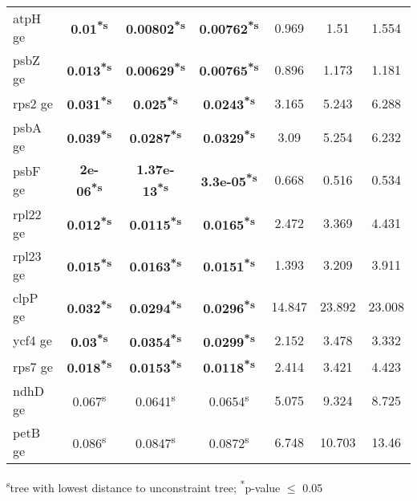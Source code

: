 \documentclass[a4paper]{article}
\begin{document}
\begin{longtable}{l|c|c|c|c|c|c}
atpH ge&\textbf{0.01\textsuperscript{*}\textsuperscript{s}}&\textbf{0.00802\textsuperscript{*}\textsuperscript{s}}&\textbf{0.00762\textsuperscript{*}\textsuperscript{s}}&0.969&1.51&1.554\\
psbZ ge&\textbf{0.013\textsuperscript{*}\textsuperscript{s}}&\textbf{0.00629\textsuperscript{*}\textsuperscript{s}}&\textbf{0.00765\textsuperscript{*}\textsuperscript{s}}&0.896&1.173&1.181\\
rps2 ge&\textbf{0.031\textsuperscript{*}\textsuperscript{s}}&\textbf{0.025\textsuperscript{*}\textsuperscript{s}}&\textbf{0.0243\textsuperscript{*}\textsuperscript{s}}&3.165&5.243&6.288\\
psbA ge&\textbf{0.039\textsuperscript{*}\textsuperscript{s}}&\textbf{0.0287\textsuperscript{*}\textsuperscript{s}}&\textbf{0.0329\textsuperscript{*}\textsuperscript{s}}&3.09&5.254&6.232\\
psbF ge&\textbf{2e-06\textsuperscript{*}\textsuperscript{s}}&\textbf{1.37e-13\textsuperscript{*}\textsuperscript{s}}&\textbf{3.3e-05\textsuperscript{*}\textsuperscript{s}}&0.668&0.516&0.534\\
rpl22 ge&\textbf{0.012\textsuperscript{*}\textsuperscript{s}}&\textbf{0.0115\textsuperscript{*}\textsuperscript{s}}&\textbf{0.0165\textsuperscript{*}\textsuperscript{s}}&2.472&3.369&4.431\\
rpl23 ge&\textbf{0.015\textsuperscript{*}\textsuperscript{s}}&\textbf{0.0163\textsuperscript{*}\textsuperscript{s}}&\textbf{0.0151\textsuperscript{*}\textsuperscript{s}}&1.393&3.209&3.911\\
clpP ge&\textbf{0.032\textsuperscript{*}\textsuperscript{s}}&\textbf{0.0294\textsuperscript{*}\textsuperscript{s}}&\textbf{0.0296\textsuperscript{*}\textsuperscript{s}}&14.847&23.892&23.008\\
ycf4 ge&\textbf{0.03\textsuperscript{*}\textsuperscript{s}}&\textbf{0.0354\textsuperscript{*}\textsuperscript{s}}&\textbf{0.0299\textsuperscript{*}\textsuperscript{s}}&2.152&3.478&3.332\\
rps7 ge&\textbf{0.018\textsuperscript{*}\textsuperscript{s}}&\textbf{0.0153\textsuperscript{*}\textsuperscript{s}}&\textbf{0.0118\textsuperscript{*}\textsuperscript{s}}&2.414&3.421&4.423\\
ndhD ge&0.067\textsuperscript{s}&0.0641\textsuperscript{s}&0.0654\textsuperscript{s}&5.075&9.324&8.725\\
petB ge&0.086\textsuperscript{s}&0.0847\textsuperscript{s}&0.0872\textsuperscript{s}&6.748&10.703&13.46\\
\end{longtable}
\textsuperscript{s}tree with lowest distance to unconstraint tree; \textsuperscript{*}p-value $\leq$ 0.05
\end{document}
